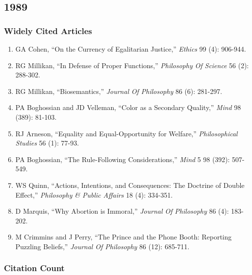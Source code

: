 \documentclass[
  10pt,
  letterpaper,
  DIV=11,
  numbers=noendperiod,
  twoside]{scrartcl}
\providecommand{\tightlist}{%
  \setlength{\itemsep}{0pt}\setlength{\parskip}{0pt}}\usepackage{longtable,booktabs,array}
\begin{document}
\newpage

\subsection{1989}\label{sec-s1989}

\subsubsection*{Widely Cited Articles}\label{widely-cited-articles-13}

\begin{enumerate}
\def\labelenumi{\arabic{enumi}.}
\tightlist
\item
  GA Cohen, ``On the Currency of Egalitarian Justice,'' \emph{Ethics} 99
  (4): 906-944.
\item
  RG Millikan, ``In Defense of Proper Functions,'' \emph{Philosophy Of
  Science} 56 (2): 288-302.
\item
  RG Millikan, ``Biosemantics,'' \emph{Journal Of Philosophy} 86 (6):
  281-297.
\item
  PA Boghossian and JD Velleman, ``Color as a Secondary Quality,''
  \emph{Mind} 98 (389): 81-103.
\item
  RJ Arneson, ``Equality and Equal-Opportunity for Welfare,''
  \emph{Philosophical Studies} 56 (1): 77-93.
\item
  PA Boghossian, ``The Rule-Following Considerations,'' \emph{Mind} 5 98
  (392): 507-549.
\item
  WS Quinn, ``Actions, Intentions, and Consequences: The Doctrine of
  Double Effect,'' \emph{Philosophy \& Public Affairs} 18 (4): 334-351.
\item
  D Marquis, ``Why Abortion is Immoral,'' \emph{Journal Of Philosophy}
  86 (4): 183-202.
\item
  M Crimmins and J Perry, ``The Prince and the Phone Booth: Reporting
  Puzzling Beliefs,'' \emph{Journal Of Philosophy} 86 (12): 685-711.
\end{enumerate}

\subsubsection*{Citation Count}\label{sec-count-1989}
\end{document}
